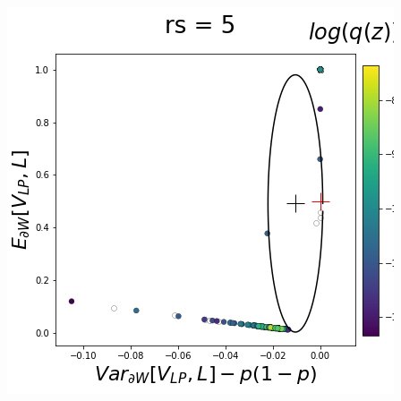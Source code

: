 \documentclass[11pt]{article}
\begin{document}
\begin{center}
\includegraphics[scale=0.33]{figs/T_x_SC_reduced_c=0_p=50_rs=5.png}
\end{center}
\end{document}
